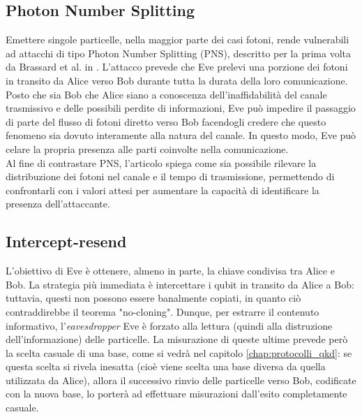 \subsection{Photon Number Splitting}
Emettere singole particelle, nella maggior parte dei casi fotoni, rende vulnerabili ad attacchi di tipo Photon Number Splitting (PNS), descritto per la prima volta da Brassard et al. in \cite{limitation_practical_qc}. L'attacco prevede che Eve prelevi una porzione dei fotoni in transito da Alice verso Bob durante tutta la durata della loro comunicazione.\\
Posto che sia Bob che Alice siano a conoscenza dell'inaffidabilità del canale trasmissivo e delle possibili perdite di informazioni, Eve può impedire il passaggio di parte del flusso di fotoni diretto verso Bob facendogli credere che questo fenomeno sia dovuto interamente alla natura del canale. In questo modo, Eve può celare la propria presenza alle parti coinvolte nella comunicazione. \\
Al fine di contrastare PNS, l'articolo \cite{revealing_pns} spiega come sia possibile rilevare la distribuzione dei fotoni nel canale e il tempo di trasmissione, permettendo di confrontarli con i valori attesi per aumentare la capacità di identificare la presenza dell'attaccante.

\subsection{Intercept-resend}
L'obiettivo di Eve è ottenere, almeno in parte, la chiave condivisa tra Alice e Bob. La strategia più immediata è intercettare i qubit in transito da Alice a Bob: tuttavia, questi non possono essere banalmente copiati, in quanto ciò contraddirebbe il teorema "no-cloning". Dunque, per estrarre il contenuto informativo, l'\textit{eavesdropper} Eve è forzato alla lettura (quindi alla distruzione dell'informazione) delle particelle. La misurazione di queste ultime prevede però la scelta casuale di una base, come si vedrà nel capitolo \ref{chap:protocolli_qkd}: se questa scelta si rivela inesatta (cioè viene scelta una base diversa da quella utilizzata da Alice), allora il successivo rinvio delle particelle verso Bob, codificate con la nuova base, lo porterà ad effettuare misurazioni dall'esito completamente casuale.

